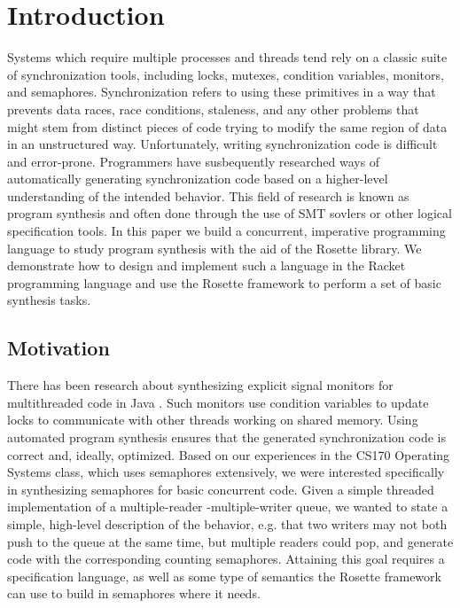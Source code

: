 \section{Introduction}
Systems which require multiple processes and threads tend rely on a classic suite of synchronization tools, including locks, mutexes, condition variables, monitors, and semaphores.  Synchronization refers to using these primitives in a way that prevents data races, race conditions, staleness, and any other problems that might stem from distinct pieces of code trying to modify the same region of data in an unstructured way.  Unfortunately, writing synchronization code is difficult and error-prone.  Programmers have susbequently researched ways of automatically generating synchronization code based on a higher-level understanding of the intended behavior.  This field of research is known as program synthesis and often done through the use of SMT sovlers or other logical specification tools.  In this paper we build a concurrent, imperative programming language to study program synthesis with the aid of the Rosette library.  We demonstrate how to design and implement such a language in the Racket programming language and use the Rosette framework to perform a set of basic synthesis tasks.

\subsection{Motivation}
There has been research about synthesizing explicit signal monitors for multithreaded code in Java \cite{ferles2018}. Such monitors use condition variables to update locks to communicate with other threads working on shared memory. Using automated program synthesis ensures that the generated synchronization code is correct and, ideally, optimized.  Based on our experiences in the CS170 Operating Systems class, which uses semaphores extensively, we were interested specifically in synthesizing semaphores for basic concurrent code.  Given a simple threaded implementation of a multiple-reader -multiple-writer queue, we wanted to state a simple, high-level description of the behavior, e.g. that two writers may not both push to the queue at the same time, but multiple readers could pop, and generate code with the corresponding counting semaphores.  Attaining this goal requires a specification language, as well as some type of semantics the Rosette framework can use to build in semaphores where it needs.  

